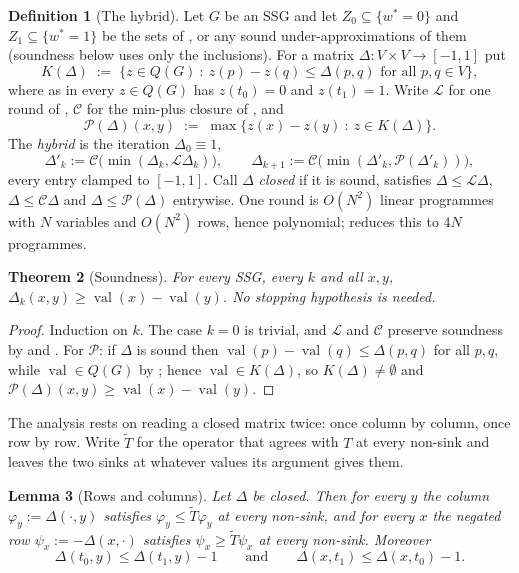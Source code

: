 \documentclass[11pt]{article}
\theoremstyle{plain}
\newtheorem{theorem}{Theorem}[section]
\newtheorem{lemma}[theorem]{Lemma}
\theoremstyle{definition}
\newtheorem{definition}[theorem]{Definition}
\DeclareMathOperator{\val}{val}
\begin{document}
\begin{definition}[The hybrid]\label{def:hybrid}
Let $G$ be an SSG and let $Z_0\subseteq\{w^\ast=0\}$ and
$Z_1\subseteq\{w^\ast=1\}$ be the sets of , or any
sound under-approximations of them (soundness below uses only the
inclusions). For a matrix
$\Delta\colon V\times V\to[-1,1]$ put
\[
  K(\Delta)\;:=\;\bigl\{z\in Q(G)\ :\ z(p)-z(q)\le\Delta(p,q)
  \text{ for all }p,q\in V\bigr\},
\]
where as in  every $z\in Q(G)$ has $z(t_0)=0$ and
$z(t_1)=1$. Write $\mathcal L$ for one round of ,
$\mathcal C$ for the min-plus closure of , and
\[
  \mathcal P(\Delta)(x,y)\;:=\;\max\{z(x)-z(y)\ :\ z\in K(\Delta)\} .
\]
The \emph{hybrid} is the iteration $\Delta_0\equiv1$,
\[
  \Delta'_k:=\mathcal C\bigl(\min(\Delta_k,\mathcal L\Delta_k)\bigr),
  \qquad
  \Delta_{k+1}:=\mathcal C\bigl(\min(\Delta'_k,\mathcal P(\Delta'_k))\bigr),
\]
every entry clamped to $[-1,1]$. Call $\Delta$ \emph{closed} if it is
sound, satisfies $\Delta\le\mathcal L\Delta$, $\Delta\le\mathcal C\Delta$
and $\Delta\le\mathcal P(\Delta)$ entrywise. One round is $O(N^{2})$
linear programmes with $N$ variables and $O(N^{2})$ rows, hence
polynomial;  reduces this to $4N$ programmes.
\end{definition}

\begin{theorem}[Soundness]\label{thm:hybrid-sound}
For every SSG, every $k$ and all $x,y$,
$\Delta_k(x,y)\ge\val(x)-\val(y)$. No stopping hypothesis is needed.
\end{theorem}

\begin{proof}
Induction on $k$. The case $k=0$ is trivial, and $\mathcal L$ and
$\mathcal C$ preserve soundness by  and
. For $\mathcal P$: if $\Delta$ is sound then
$\val(p)-\val(q)\le\Delta(p,q)$ for all $p,q$, while
$\val\in Q(G)$ by ; hence $\val\in K(\Delta)$,
so $K(\Delta)\ne\emptyset$ and
$\mathcal P(\Delta)(x,y)\ge\val(x)-\val(y)$.
\end{proof}

The analysis rests on reading a closed matrix twice: once column by
column, once row by row. Write $\widetilde T$ for the operator that
agrees with $T$ at every non-sink and leaves the two sinks at whatever
values its argument gives them.

\begin{lemma}[Rows and columns]\label{lem:hybrid-fix}
Let $\Delta$ be closed. Then for every $y$ the column
$\varphi_y:=\Delta(\cdot,y)$ satisfies
$\varphi_y\le\widetilde T\varphi_y$ at every non-sink, and for every $x$
the negated row $\psi_x:=-\Delta(x,\cdot)$ satisfies
$\psi_x\ge\widetilde T\psi_x$ at every non-sink. Moreover
\[
  \Delta(t_0,y)\le\Delta(t_1,y)-1
  \qquad\text{and}\qquad
  \Delta(x,t_1)\le\Delta(x,t_0)-1 .
\]
\end{lemma}
\end{document}
